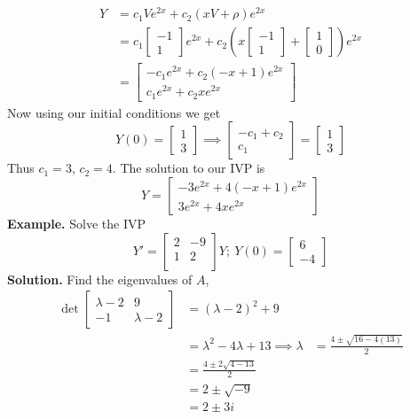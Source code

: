 \documentclass[openany]{report}
\begin{document}
\begin{align*}
    Y &= c_1Ve^{2x} + c_2(xV + \rho)e^{2x}\\
    &= c_1\begin{bmatrix}
        -1\\
        1
    \end{bmatrix}  e^{2x} + c_2\left(x\begin{bmatrix}
        -1\\
        1
    \end{bmatrix} + \begin{bmatrix}
        1\\
        0
    \end{bmatrix}\right) e^{2x}\\
    &= \begin{bmatrix}
        -c_1e^{2x} + c_2(-x + 1)e^{2x}\\
        c_1e^{2x} + c_2xe^{2x}
    \end{bmatrix}
\end{align*}
Now using our initial conditions we get 
\[Y(0) = \begin{bmatrix}
    1\\
    3
\end{bmatrix}\implies \begin{bmatrix}
    -c_1 + c_2\\
    c_1
\end{bmatrix} = \begin{bmatrix}
    1\\
    3
\end{bmatrix}\]
Thus $c_1 = 3$, $c_2 = 4$. The solution to our IVP is 
\[Y = \begin{bmatrix}
    -3e^{2x} + 4(-x+1)e^{2x}\\
    3e^{2x} + 4xe^{2x}
\end{bmatrix}\]
\textbf{Example.}
Solve the IVP 
\[Y' = \begin{bmatrix}
    2 & -9\\
    1 & 2\\
\end{bmatrix}Y;\ Y(0) = \begin{bmatrix}
    6\\
    -4
\end{bmatrix}\]
\textbf{Solution.} Find the eigenvalues of $A$, 
\begin{align*}
    \det\begin{bmatrix}
        \lambda - 2 & 9\\
        -1 & \lambda - 2
    \end{bmatrix} &= (\lambda - 2)^2 + 9\\
    &= \lambda^2 - 4\lambda + 13
    \implies \lambda &= \frac{4 \pm \sqrt{16 - 4(13)}}{2}\\
    &= \frac{4 \pm 2\sqrt{4 - 13}}{2}\\
    &= 2 \pm \sqrt{-9}\\
    &= 2 \pm 3i
\end{align*}
\end{document}
